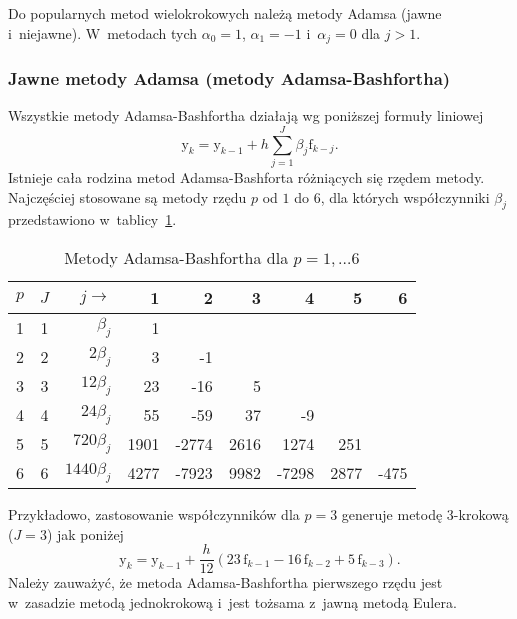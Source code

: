 \documentclass[paper=a4,DIV=12]{tmmlab}
\newcommand{\brm}[1]{\bm{\mathrm{#1}}}
\begin{document}
\begin{appendices}
Do popularnych metod wielokrokowych należą metody Adamsa (jawne i~niejawne).
W~metodach tych $\alpha_0=1$, $\alpha_1=-1$ i~$\alpha_j = 0$ dla $j > 1$.

\subsubsection{Jawne metody Adamsa (metody Adamsa-Bashfortha)}
\label{sec:JVLO6}

Wszystkie metody Adamsa-Bashfortha działają wg poniższej formuły liniowej
\begin{equation}
  \brm{y}_k = \brm{y}_{k-1} + h \sum_{j=1}^J \beta_j \brm{f}_{k-j}.
  \label{eq:DUQAC}
\end{equation}
Istnieje cała rodzina metod Adamsa-Bashforta różniących się rzędem metody.
Najczęściej stosowane są metody rzędu $p$ od $1$ do $6$, dla których
współczynniki $\beta_j$ przedstawiono w~tablicy~\ref{tab:OWS53}.
\begin{table}[htbp]
  \caption{Metody Adamsa-Bashfortha dla $p=1,\dots6$}
  \label{tab:OWS53}
  \centering
  \begin{tabular}{|c|c|r|r|r|r|r|r|r|}
    \hline
    $p$ & $J$ & $j \rightarrow$ &    1 &    2 &    3 &    4 & 5    & 6    \\ \hline
     1  &  1  &   $\beta_j$     &    1 &      &      &      &      &      \\
     2  &  2  &   $2\beta_j$    &    3 &   -1 &      &      &      &      \\
     3  &  3  &  $12\beta_j$    &   23 &  -16 &    5 &      &      &      \\
     4  &  4  &  $24\beta_j$    &   55 &  -59 &   37 &   -9 &      &      \\
     5  &  5  & $720\beta_j$    & 1901 &-2774 & 2616 & 1274 &  251 &      \\
     6  &  6  &$1440\beta_j$    & 4277 &-7923 & 9982 &-7298 & 2877 & -475 \\ \hline
  \end{tabular}
\end{table}
Przykładowo, zastosowanie współczynników dla $p=3$ generuje metodę 3-krokową
($J=3$) jak poniżej
\begin{equation}
  \brm{y}_{k} =  \brm{y}_{k-1} + \frac{h}{12} \left(23\,\brm{f}_{k-1} - 16\,\brm{f}_{k-2} + 5\,\brm{f}_{k-3} \right).
  \label{eq:IYF96}
\end{equation}
Należy zauważyć, że metoda Adamsa-Bashfortha pierwszego rzędu jest w~zasadzie
metodą jednokrokową i~jest tożsama z~jawną metodą Eulera.



\end{appendices}
\end{document}
